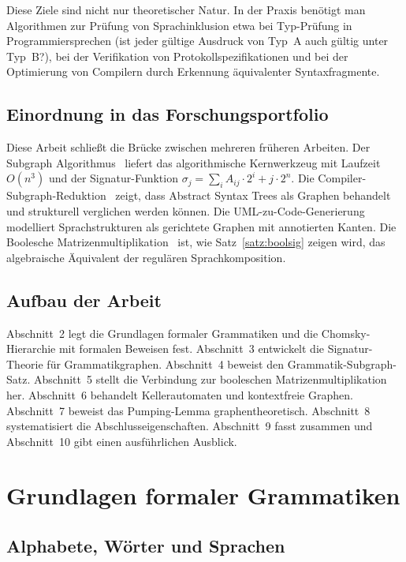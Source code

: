 ﻿\documentclass[a4paper,12pt]{article}
\theoremstyle{definition}
\begin{document}
Diese Ziele sind nicht nur theoretischer Natur. In der Praxis ben\"otigt man
Algorithmen zur Pr\"ufung von Sprachinklusion etwa bei Typ-Pr\"ufung in
Programmiersprechen (ist jeder g\"ultige Ausdruck von Typ~A auch g\"ultig
unter Typ~B?), bei der Verifikation von Protokollspezifikationen und bei der
Optimierung von Compilern durch Erkennung \"aquivalenter Syntaxfragmente.

\subsection{Einordnung in das Forschungsportfolio}

Diese Arbeit schlie{\ss}t die Br\"ucke zwischen mehreren fr\"uheren Arbeiten.
Der Subgraph Algorithmus~\cite{epp2026subgraph} liefert das algorithmische
Kernwerkzeug mit Laufzeit $O(n^3)$ und der Signatur-Funktion
$\sigma_j = \sum_i A_{ij} \cdot 2^i + j \cdot 2^n$.
Die Compiler-Subgraph-Reduktion~\cite{epp2026ccl} zeigt, dass Abstract Syntax
Trees als Graphen behandelt und strukturell verglichen werden k\"onnen.
Die UML-zu-Code-Generierung~\cite{epp2026umlp} modelliert Sprachstrukturen
als gerichtete Graphen mit annotierten Kanten.
Die Boolesche Matrizenmultiplikation~\cite{epp2026boolmm} ist, wie Satz~\ref{satz:boolsig}
zeigen wird, das algebraische \"Aquivalent der regul\"aren Sprachkomposition.

\subsection{Aufbau der Arbeit}

Abschnitt~2 legt die Grundlagen formaler Grammatiken und die Chomsky-Hierarchie
mit formalen Beweisen fest. Abschnitt~3 entwickelt die Signatur-Theorie f\"ur
Grammatikgraphen. Abschnitt~4 beweist den Grammatik-Subgraph-Satz.
Abschnitt~5 stellt die Verbindung zur booleschen Matrizenmultiplikation her.
Abschnitt~6 behandelt Kellerautomaten und kontextfreie Graphen.
Abschnitt~7 beweist das Pumping-Lemma graphentheoretisch.
Abschnitt~8 systematisiert die Abschlusseigenschaften.
Abschnitt~9 fasst zusammen und Abschnitt~10 gibt einen ausf\"uhrlichen Ausblick.

\section{Grundlagen formaler Grammatiken}

\subsection{Alphabete, W\"orter und Sprachen}
\end{document}
